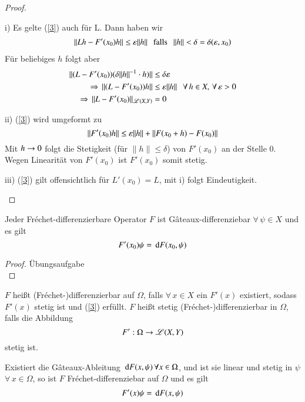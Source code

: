 \begin{proof}

\begin{description}

\item{i)} 
Es gelte (\ref{3}) auch für L. Dann haben wir
\begin{align*}
    \|Lh-F'(x_0)h\| \leq \varepsilon \|h\| \hspace{.25cm} \text{falls} \hspace{.25cm} \|h\| < \delta = \delta(\varepsilon, x_0)
\end{align*}
Für beliebiges $h$ folgt aber
\begin{align*}
    \|(L-F'(x_0)) (\delta\|h\|^{-1}\cdot h)\|&\leq \delta\varepsilon\\
    \Rightarrow \, \|(L-F'(x_0))h  \|&\leq \varepsilon \|h\| \hspace{.25cm} \forall \, h\in X, \, \forall \, \varepsilon>0 \\
    \Rightarrow \, \|L-F'(x_0)\|_{\mathscr L(X,Y)} &= 0
\end{align*}

\item{ii)}
(\ref{3}) wird umgeformt zu
\[
    \|F'(x_0) h \| \leq \varepsilon \|h\| + \|F(x_0+h)-F(x_0)\|
\]
Mit $h\rightarrow 0$ folgt die Stetigkeit (für $\|h\|\leq \delta$) von $F'(x_0)$ an der Stelle 0. 
Wegen Linearität von $F'(x_0)$ ist $F'(x_0)$ somit stetig. 

\item{iii)} (\ref{3}) gilt offensichtlich für $L'(x_0)=L$, mit i) folgt Eindeutigkeit.
\end{description}
\[ \]
\end{proof}


\begin{prop}
    Jeder Fréchet-differenzierbare Operator $F$ ist Gâteaux-differenziebar $\forall \, \psi\in X$ 
    und es gilt
    \[
        F'(x_0)\psi=\, \mathrm{d} F(x_0,\psi)
    \]
\end{prop}
\begin{proof}
    Übungsaufgabe \[\]
\end{proof}

\begin{defi}
    $F$ heißt (Fréchet-)differenzierbar auf $\Omega$, falls $\forall\, x\in X$ ein $F'(x)$ existiert,
    sodass $F'(x)$ stetig ist  und (\ref{3}) erfüllt. $F$ heißt stetig (Fréchet-)differenzierbar in
    $\Omega$, falls die Abbildung
    \[
        F': \Omega\rightarrow \mathscr L(X,Y)
    \]
    stetig ist.
\end{defi}

\begin{prop}
    Existiert die Gâteaux-Ableitung $\, \mathrm{d} F(x,\psi) \, \forall x\in \Omega$, und ist sie linear und
    stetig in $\psi$ $\forall\, x\in \Omega$, so ist $F$ Fréchet-differenziebar auf $\Omega$ und
    es gilt 
    \[
        F'(x)\psi=\, \mathrm{d} F(x,\psi)
    \]
\end{prop}

